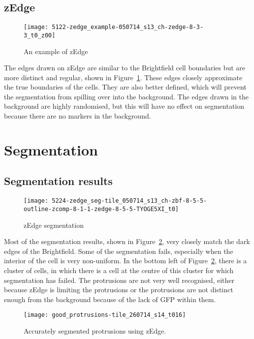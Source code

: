 \subsection{zEdge}

\begin{figure}[htbp!]
\centering
\texttt{[image: 5122-zedge\_example-050714\_s13\_ch-zedge-8-3-3\_t0\_z00]}
\caption{An example of zEdge}
\label{fig:zedge_example}
\end{figure}

The edges drawn on zEdge are similar to the Brightfield cell boundaries but are more distinct and regular, shown in Figure~\ref{fig:zedge_example}. These edges closely approximate the true boundaries of the cells. They are also better defined, which will prevent the segmentation from spilling over into the background. The edges drawn in the background are highly randomised, but this will have no effect on segmentation because there are no markers in the background.

\section{Segmentation}

\subsection{Segmentation results}

\begin{figure}[htbp!]
\centering
\texttt{[image: 5224-zedge\_seg-tile\_050714\_s13\_ch-zbf-8-5-5-outline-zcomp-8-1-1-zedge-8-5-5-TYOGE5XI\_t0]}
\caption{zEdge segmentation}
\label{fig:zedge_segmentation}
\end{figure}

Most of the segmentation results, shown in Figure~\ref{fig:zedge_segmentation}, very closely match the dark edges of the Brightfield. Some of the segmentation fails, especially when the interior of the cell is very non-uniform. In the bottom left of Figure~\ref{fig:zedge_segmentation}, there is a cluster of cells, in which there is a cell at the centre of this cluster for which segmentation has failed. The protrusions are not very well recognised, either because zEdge is limiting the protrusions or the protrusions are not distinct enough from the background because of the lack of GFP within them.

\begin{figure}[htbp!]
\centering
\texttt{[image: good\_protrusions-tile\_260714\_s14\_t016]}
\caption{Accurately segmented protrusions using zEdge.}
\label{fig:accurate_zedge}
\end{figure}

